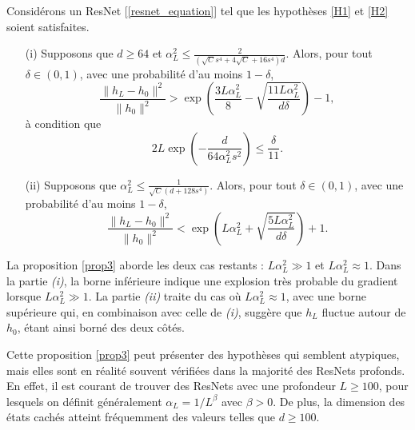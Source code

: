 \begin{proposition}[Admise]\label{prop3}
    Considérons un ResNet [\ref{resnet_equation}] tel que les hypothèses \ref{H1} et \ref{H2} soient satisfaites.
    \begin{itemize}
        \item[(i)] Supposons que $ d \geq 64 $ et $ \alpha _L ^2 \leq  \frac{2 }{(\sqrt{C } s^4 + 4 \sqrt{C } + 16 s ^4)d} $. Alors, pour tout $ \delta \in (0, 1) $, avec une probabilité d'au moins $ 1 - \delta $,
        \[
            \frac{\|h_L - h_0\|^2}{\|h_0\|^2} > \exp\left(\frac{3L\alpha_L^2}{8} - \sqrt{\frac{11L\alpha_L^2}{d\delta}}\right) - 1,
        \]
        à condition que
        \[
            2L \exp\left(-\frac{d}{64\alpha_L^2s^2}\right) \leq \frac{\delta}{11}.
        \]
        \item[(ii)] Supposons que $ \alpha_L^2 \leq \frac{1}{\sqrt{C}(d + 128s^4)} $. Alors, pour tout $ \delta \in (0, 1)$, avec une probabilité d'au moins $1 - \delta $,
        \[
            \frac{\|h_L - h_0\|^2}{\|h_0\|^2} < \exp\left(L\alpha_L^2 + \sqrt{\frac{5L\alpha_L^2}{d\delta}}\right) + 1.
        \]
    \end{itemize}
\end{proposition}
La proposition \ref{prop3} aborde les deux cas restants : $L \alpha_L^2 \gg 1$ et $L \alpha_L^2 \approx 1$. Dans la partie \textit{(i)}, la borne inférieure indique une explosion très probable du gradient lorsque $L \alpha_L^2 \gg 1$. La partie \textit{(ii)} traite du cas où $L \alpha_L^2 \approx 1$, avec une borne supérieure qui, en combinaison avec celle de \textit{(i)}, suggère que $h_L$ fluctue autour de $h_0$, étant ainsi borné des deux côtés.

Cette proposition \ref{prop3} peut présenter des hypothèses qui semblent atypiques, mais elles sont en réalité souvent vérifiées dans la majorité des ResNets profonds. En effet, il est courant de trouver des ResNets avec une profondeur $L \geq 100$, pour lesquels on définit généralement $\alpha_L = 1 / L^\beta$ avec $\beta > 0$. De plus, la dimension des états cachés atteint fréquemment des valeurs telles que $d \geq 100$.

